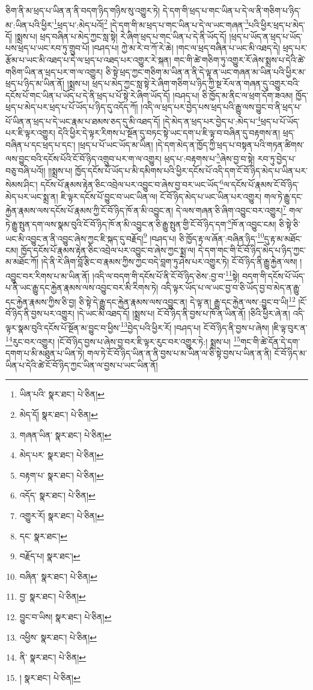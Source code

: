 ཅིག་ནི་མ་ཕྲད་པ་ཡིན་ན་ནི་བདག་ཉིད་གཉིས་སུ་འགྱུར་ཏེ། དེ་དག་གི་ཕྲད་པ་གང་ཡིན་པ་དེ་ལ་ནི་གཅིག་པ་ཉིད་མ་:ཡིན་པའི་ཕྱིར་\footnote{ཡིན་པའི་  སྣར་ཐང་།  པེ་ཅིན། }ཕྲད་པ་:མེད་པའོ།\footnote{མེད་དོ།  སྣར་ཐང་།  པེ་ཅིན། } །དེ་དག་གི་མ་ཕྲད་པ་གང་ཡིན་པ་དེ་ལ་ཡང་གཞན་\footnote{གཞན་ཡིན་  སྣར་ཐང་།  པེ་ཅིན། }པའི་ཕྱིར་ཕྲད་པ་མེད་དོ། །སྨྲས་པ། ཕྲད་བཞིན་པ་མེད་ཀྱང་སླ་སྟེ། རེ་ཞིག་ཕྲད་པ་གང་ཡིན་པ་དེ་ནི་ཡོད་དོ། །ཕྲད་པ་ཡོད་ན་ཕྲད་པ་ཡོད་པས་ཕྲད་པ་ཡང་རབ་ཏུ་གྲུབ་པོ། །བཤད་པ། ཀྱེ་མ་རེ་བ་ཀོ་རེ་ཆེ། །གང་ལ་ཕྲད་བཞིན་པ་ཡང་མི་འཐད་དེ། ཕྲད་པར་རྩོམ་པ་ཡང་མི་འཐད་པ་དེ་ལ་ཕྲད་པ་འཐད་པར་འགྱུར་རེ་སྐན། གང་གི་ཚེ་གཅིག་ཏུ་འགྱུར་རོ་ཞེས་སྨྲས་པ་དེའི་ཚེ་གཅིག་ཡིན་ན་ཕྲད་པར་ག་ལ་འགྱུར། ཅི་སྟེ་ཕྲད་ཀྱང་གཅིག་མ་ཡིན་ན་ནི་དེ་ལྟ་ན་ཡང་གཞན་མ་ཡིན་པའི་ཕྱིར་མ་ཕྲད་པ་ཉིད་མ་ཡིན་ནོ། །སྨྲས་པ། ཕྲད་པ་མེད་ཀྱང་སླ་སྟེ་རེ་ཞིག་གཅིག་པ་ཉིད་ཀྱི་སྔ་རོལ་ན་གཞན་དུ་འགྱུར་བའི་དངོས་པོ་གང་ཡིན་པ་ཡོད་པ་དེ་ནི་ཕྲད་པ་པོ་སྟེ་རེ་ཞིག་ཡོད་དོ། །བཤད་པ། ཅི་ཁྱོད་མ་ནིང་ལ་ཕྲག་དོག་ཟའམ། ཁྱོད་ཕྲད་པ་མེད་པར་ཕྲད་པ་པོ་ཡོད་པ་ཉིད་དུ་འདོད་ཀོ། །འདི་ལ་ཕྲད་པར་བྱེད་པས་ཕྲད་པའི་རྒྱུ་ལས་བྱུང་བ་ནི་ཕྲད་པ་པོ་ཡིན་ན་ཕྲད་པ་དེ་ཡང་རྣམ་པ་ཐམས་ཅད་དུ་མི་འཐད་དོ། །དེ་མེད་ན་ཕྲད་པར་བྱེད་པ་:མེད་པ་\footnote{མེད་པར་  སྣར་ཐང་།  པེ་ཅིན། }ཕྲད་པ་པོ་ཡོད་པར་ཇི་ལྟར་འགྱུར། དེའི་ཕྱིར་དེ་ལྟར་རིགས་པ་སྔོན་དུ་བཏང་སྟེ་ཡང་དག་པ་ཇི་ལྟ་བ་བཞིན་དུ་བརྟགས་ན། ཕྲད་བཞིན་པ་དང་ཕྲད་པ་དང་། །ཕྲད་པ་པོ་ཡང་ཡོད་མ་ཡིན། །དེ་དག་མེད་ན་ཁྱོད་ཀྱི་ཕྲད་པ་བསྟན་པའི་གཏན་ཚིགས་ལས་བྱུང་བའི་དངོས་པོའི་ངོ་བོ་ཉིད་འགྲུབ་པར་ག་ལ་འགྱུར། ཕྲད་པ་:བརྟགས་པ་\footnote{བརྟག་པ་  སྣར་ཐང་།  པེ་ཅིན། }ཞེས་བྱ་བ་སྟེ། རབ་ཏུ་བྱེད་པ་བཅུ་བཞི་པའོ།། །།སྨྲས་པ། ཁྱོད་དངོས་པོ་ཡོད་པ་མི་དམིགས་པའི་ཕྱིར་དངོས་པོ་འདི་དག་ངོ་བོ་ཉིད་མེད་པ་ཡིན་པར་སེམས་ཤིང་། དངོས་པོ་རྣམས་རྟེན་ཅིང་འབྲེལ་པར་འབྱུང་བ་ཞེས་བྱ་བར་ཡང་ཡོད་\footnote{འདོད་  སྣར་ཐང་།  པེ་ཅིན། }ལ་དངོས་པོ་རྣམས་ངོ་བོ་ཉིད་མེད་པར་ཡང་སྨྲ་ན། ཇི་ལྟར་དངོས་པོ་བྱུང་བ་ཡང་ཡིན་ལ། ངོ་བོ་ཉིད་མེད་པ་ཡང་ཡིན་པར་འགྱུར། གལ་ཏེ་རྒྱུ་དང་རྐྱེན་རྣམས་ལས་དངོས་པོ་རྣམས་ཀྱི་ངོ་བོ་ཉིད་ཁོ་ན་མི་འབྱུང་ན། དེ་ལས་གཞན་ཅི་ཞིག་འབྱུང་བར་འགྱུར།\footnote{འགྱུར་རོ།  སྣར་ཐང་།  པེ་ཅིན། } གལ་ཏེ་རྒྱུ་སྤུན་དག་ལས་སྣམ་བུའི་ངོ་བོ་ཉིད་ཁོ་ན་མི་འབྱུང་ན་ཅི་རྒྱུ་སྤུན་གྱི་ངོ་བོ་ཉིད་དག་\footnote{དང་  སྣར་ཐང་། }ཁོ་ན་འབྱུང་ངམ། ཅི་སྟེ་ཅི་ཡང་མི་འབྱུང་ན་ནི་འབྱུང་ཞེས་ཀྱང་ཇི་སྐད་དུ་བརྗོད།\footnote{བརྗོད་པ།  སྣར་ཐང་། } །བཤད་པ། ཅི་ཁྱོད་རྟ་ལ་ཞོན་:བཞིན་ཉིད་\footnote{བཞིན་  སྣར་ཐང་།  པེ་ཅིན། }དུ་རྟ་མ་མཐོང་ངམ། ཁྱོད་དངོས་པོ་རྣམས་རྟེན་ཅིང་འབྲེལ་པར་འབྱུང་བ་ཞེས་ཀྱང་སྨྲ་ལ། དེ་དག་གང་གི་ངོ་བོ་ཉིད་མེད་པ་ཉིད་ཀྱང་མ་མཐོང་ཀོ། །དེ་ནི་རེ་ཞིག་བློ་རྩིང་བ་རྣམས་ཀྱིས་ཀྱང་བདེ་བླག་ཏུ་ཤེས་པར་འགྱུར་ཏེ། ངོ་བོ་ཉིད་ནི་རྒྱུ་རྐྱེན་ལས། །འབྱུང་བར་རིགས་པ་མ་ཡིན་ནོ། །འདི་ལ་བདག་གི་དངོས་པོ་ནི་ངོ་བོ་ཉིད་ཅེས་:བྱ་བ་\footnote{བྱ་  སྣར་ཐང་།  པེ་ཅིན། }སྟེ། བདག་གི་དངོས་པོ་ཡོད་པ་ནི་ཡང་རྒྱུ་དང་རྐྱེན་རྣམས་ལས་འབྱུང་བར་མི་རིགས་ཏེ། འདི་ལྟར་ཡོད་པ་ལ་ཡང་བྱ་བ་ཅི་ཡོད་བྱ་བ་མེད་ན་རྒྱུ་དང་རྐྱེན་རྣམས་ཀྱིས་ཅི་བྱ། ཅི་སྟེ་དེ་རྒྱུ་དང་རྐྱེན་རྣམས་ལས་འབྱུང་ན། དེ་ལྟ་ན། རྒྱུ་དང་རྐྱེན་ལས་:བྱུང་བ་ཡི།\footnote{བྱུང་བ་ཡིས།  སྣར་ཐང་།  པེ་ཅིན། } །ངོ་བོ་ཉིད་ནི་བྱས་པར་འགྱུར། །དེ་ཡང་མི་འཐད་དོ། །སྨྲས་པ། ངོ་བོ་ཉིད་ནི་བྱས་པ་ཁོ་ན་ཡིན་ནོ། །ཅིའི་ཕྱིར་ཞེ་ན། འདི་ལྟར་སྣམ་བུའི་དངོས་པོ་སྔོན་མ་བྱུང་བ་ཕྱིས་\footnote{འཕྱིས་  སྣར་ཐང་།  པེ་ཅིན། }བྱེད་པའི་ཕྱིར་རོ། །བཤད་པ། ངོ་བོ་ཉིད་ནི་བྱས་པ་ཞེས། །ཇི་ལྟ་བུར་ན་\footnote{ནི་  སྣར་ཐང་།  པེ་ཅིན། }རུང་བར་འགྱུར། །ངོ་བོ་ཉིད་བྱས་པ་ཞེས་བྱ་བར་ཇི་ལྟར་རུང་བར་འགྱུར་ཏེ:། སྨྲས་པ། \footnote{།    སྣར་ཐང་།  པེ་ཅིན། }གང་གི་ཚེ་དོན་དེ་དག་དགག་པ་མི་མཐུན་པ་ཡིན་ཏེ། གལ་ཏེ་ངོ་བོ་ཉིད་ཡིན་ན་ནི་བྱས་པ་མ་ཡིན་ལ་ཅི་སྟེ་བྱས་པ་ཡིན་ན་ནི། ངོ་བོ་ཉིད་མ་ཡིན་པ་དེའི་ཚེ་ངོ་བོ་ཉིད་ཀྱང་ཡིན་ལ་བྱས་པ་ཡང་ཡིན་ནོ། 
